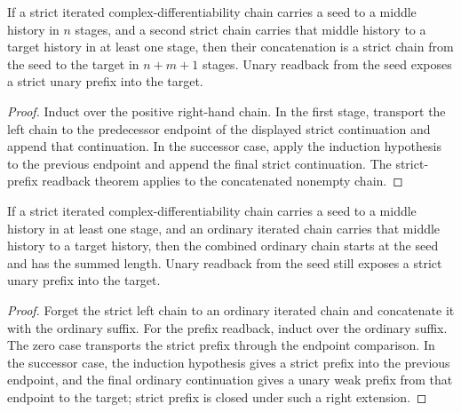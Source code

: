 \begin{theorem}
\label{thm:iterated-strict-cplx-diff-add-closed-strict-prefix-readback}
If a strict iterated complex-differentiability chain carries a seed to a
middle history in \(n\) stages, and a second strict chain carries that middle
history to a target history in at least one stage, then their concatenation is
a strict chain from the seed to the target in \(n+m+1\) stages. Unary readback
from the seed exposes a strict unary prefix into the target.
\end{theorem}
\begin{proof}
Induct over the positive right-hand chain. In the first stage, transport the
left chain to the predecessor endpoint of the displayed strict continuation
and append that continuation. In the successor case, apply the induction
hypothesis to the previous endpoint and append the final strict continuation.
The strict-prefix readback theorem applies to the concatenated nonempty chain.
\end{proof}

\begin{theorem}
\label{thm:iterated-strict-cplxdiff-ordinary-suffix-strict-prefix-readback}
If a strict iterated complex-differentiability chain carries a seed to a
middle history in at least one stage, and an ordinary iterated chain carries
that middle history to a target history, then the combined ordinary chain
starts at the seed and has the summed length. Unary readback from the seed
still exposes a strict unary prefix into the target.
\end{theorem}
\begin{proof}
Forget the strict left chain to an ordinary iterated chain and concatenate it
with the ordinary suffix. For the prefix readback, induct over the ordinary
suffix. The zero case transports the strict prefix through the endpoint
comparison. In the successor case, the induction hypothesis gives a strict
prefix into the previous endpoint, and the final ordinary continuation gives
a unary weak prefix from that endpoint to the target; strict prefix is closed
under such a right extension.
\end{proof}

